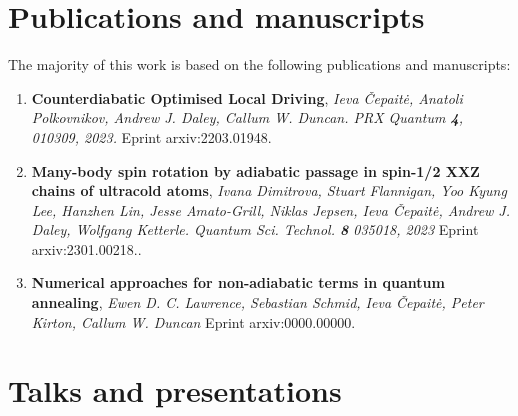
\section{Publications and manuscripts}

The majority of this work is based on the following publications and manuscripts:

\begin{enumerate}
    \item \textbf{Counterdiabatic Optimised Local Driving}, \textit{Ieva Čepaitė, Anatoli Polkovnikov, Andrew J. Daley, Callum W. Duncan. PRX Quantum \textbf{4}, 010309, 2023.} Eprint arxiv:2203.01948. \cite{cepaite_counterdiabatic_2023}
    \item \textbf{Many-body spin rotation by adiabatic passage in
    spin-1/2 XXZ chains of ultracold atoms}, \textit{Ivana Dimitrova, Stuart Flannigan, Yoo Kyung Lee, Hanzhen Lin,  Jesse Amato-Grill, Niklas Jepsen, Ieva Čepaitė, Andrew J. Daley, Wolfgang Ketterle. Quantum Sci. Technol. \textbf{8} 035018, 2023} Eprint arxiv:2301.00218.\cite{dimitrova_many-body_2023}.
    \item \textbf{Numerical approaches for non-adiabatic terms in quantum annealing}, \textit{Ewen D. C. Lawrence, Sebastian Schmid, Ieva Čepaitė, Peter Kirton, Callum W. Duncan} Eprint arxiv:0000.00000.
\end{enumerate}

\section{Talks and presentations}

